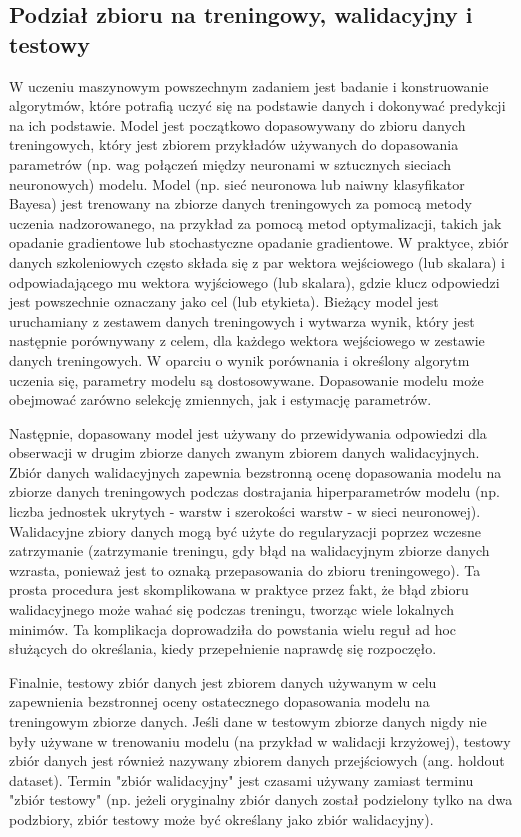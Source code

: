\documentclass[polish, twoside, 12pt, a4paper]{article}
\theoremstyle{definition}
\theoremstyle{plain}
\theoremstyle{remark}
\begin{document}
\subsection{Podział zbioru na treningowy, walidacyjny i testowy}
\label{chapter:train-test-split}
W uczeniu maszynowym powszechnym zadaniem jest badanie i konstruowanie algorytmów, które potrafią uczyć się na podstawie danych i dokonywać predykcji na ich podstawie. \cite{kohavi1998} Model jest początkowo dopasowywany do zbioru danych treningowych, który jest zbiorem przykładów używanych do dopasowania parametrów (np. wag połączeń między neuronami w sztucznych sieciach neuronowych) modelu. Model (np. sieć neuronowa lub naiwny klasyfikator Bayesa) jest trenowany na zbiorze danych treningowych za pomocą metody uczenia nadzorowanego, na przykład za pomocą metod optymalizacji, takich jak opadanie gradientowe lub stochastyczne opadanie gradientowe. W praktyce, zbiór danych szkoleniowych często składa się z par wektora wejściowego (lub skalara) i odpowiadającego mu wektora wyjściowego (lub skalara), gdzie klucz odpowiedzi jest powszechnie oznaczany jako cel (lub etykieta). Bieżący model jest uruchamiany z zestawem danych treningowych i wytwarza wynik, który jest następnie porównywany z celem, dla każdego wektora wejściowego w zestawie danych treningowych. W oparciu o wynik porównania i określony algorytm uczenia się, parametry modelu są dostosowywane. Dopasowanie modelu może obejmować zarówno selekcję zmiennych, jak i estymację parametrów.

Następnie, dopasowany model jest używany do przewidywania odpowiedzi dla obserwacji w drugim zbiorze danych zwanym zbiorem danych walidacyjnych. Zbiór danych walidacyjnych zapewnia bezstronną ocenę dopasowania modelu na zbiorze danych treningowych podczas dostrajania hiperparametrów modelu (np. liczba jednostek ukrytych - warstw i szerokości warstw - w sieci neuronowej). Walidacyjne zbiory danych mogą być użyte do regularyzacji poprzez wczesne zatrzymanie (zatrzymanie treningu, gdy błąd na walidacyjnym zbiorze danych wzrasta, ponieważ jest to oznaką przepasowania do zbioru treningowego). Ta prosta procedura jest skomplikowana w praktyce przez fakt, że błąd zbioru walidacyjnego może wahać się podczas treningu, tworząc wiele lokalnych minimów. Ta komplikacja doprowadziła do powstania wielu reguł ad hoc służących do określania, kiedy przepełnienie naprawdę się rozpoczęło.

Finalnie, testowy zbiór danych jest zbiorem danych używanym w celu zapewnienia bezstronnej oceny ostatecznego dopasowania modelu na treningowym zbiorze danych. Jeśli dane w testowym zbiorze danych nigdy nie były używane w trenowaniu modelu (na przykład w walidacji krzyżowej), testowy zbiór danych jest również nazywany zbiorem danych przejściowych (ang. holdout dataset). Termin "zbiór walidacyjny" jest czasami używany zamiast terminu "zbiór testowy" (np. jeżeli oryginalny zbiór danych został podzielony tylko na dwa podzbiory, zbiór testowy może być określany jako zbiór walidacyjny).\cite{brownlee2017}
\end{document}
